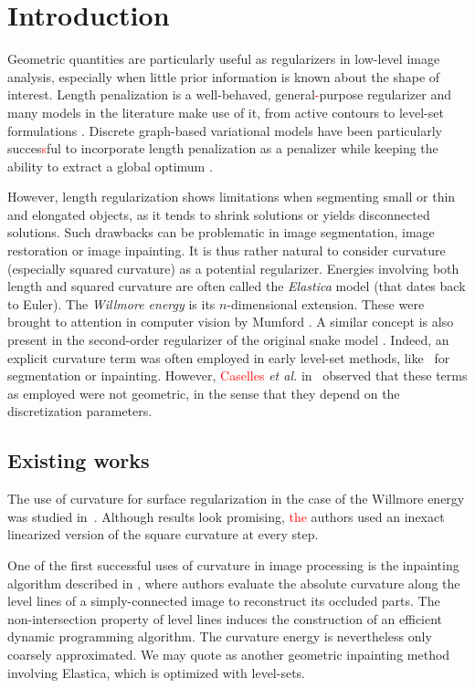 \documentclass[smallextended]{svjour3}       %
\newcommand{\todo}[1]{{\textcolor{blue}{#1}}}
\newcommand{\revision}[1]{\textcolor{red}{#1}}
\begin{document}
\section{Introduction} %

Geometric quantities are particularly useful as regularizers in
low-level image analysis, especially when little prior information is
known about the shape of interest. Length penalization is a
well-behaved, general\revision{-}purpose regularizer and many models in the
literature make use of it, from active contours
\cite{caseles97geodesic} to level-set formulations
\cite{malladi1995image,malladi1995shape}. Discrete graph-based
variational models have been particularly succes\revision{s}ful to incorporate
length penalization as a penalizer while keeping the ability to
extract a global optimum \cite{boykov01graphcut,appleton05geodesic}.

However, length regularization shows limitations when segmenting small
or thin and elongated objects, as it tends to shrink solutions or
yields disconnected solutions. Such drawbacks can be problematic in
image segmentation, image restoration or image inpainting. It is thus
rather natural to consider curvature (especially squared curvature) as
a potential regularizer. Energies involving both length and squared
curvature are often called the {\em Elastica} model (that dates back
to Euler). The {\em Willmore energy} is its $n$-dimensional
extension. These were brought to attention in computer vision by
Mumford \cite{mumford1994elastica}. A similar concept is also present
in the second-order regularizer of the original snake model
\cite{kass1988snakes}. Indeed, an explicit curvature term was often
employed in early level-set methods,
like~\cite{malladi1995image,malladi1995shape,ballester01filljoint} for
segmentation or inpainting. However, \revision{Caselles} {\em et al.}
in~\cite{caseles97geodesic} observed that these terms as employed
were not geometric, in the sense that they depend on the
discretization parameters.

\subsection{Existing works}
The use of curvature for surface regularization in the case of the
Willmore energy was studied in~\cite{bobenko2005discrete}. Although
results look promising, \revision{the} authors used an inexact linearized version of
the square curvature at every step.

One of the first successful uses of curvature in
image processing is the inpainting algorithm described in
\cite{masnou98inpainting}, where authors evaluate the absolute
curvature along the level lines of a simply-connected image to
reconstruct its occluded parts. The non-intersection property of level
lines induces the construction of an efficient dynamic programming
algorithm. The curvature energy is nevertheless only coarsely
approximated. We may quote \cite{chan02elasticainpainting} as another
geometric inpainting method involving Elastica, which is optimized with
level-sets.
\end{document}
